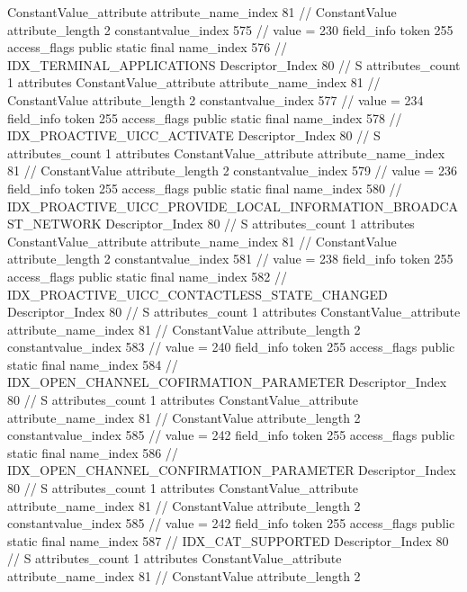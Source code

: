 {{{{{{				ConstantValue_attribute {
					attribute_name_index	81		// ConstantValue
					attribute_length	2
					constantvalue_index	575		// value = 230
				}
				}
			}
			field_info {
				token	255
				access_flags	public static final
				name_index	576		// IDX_TERMINAL_APPLICATIONS
				Descriptor_Index	80		// S
				attributes_count	1
				attributes {
				ConstantValue_attribute {
					attribute_name_index	81		// ConstantValue
					attribute_length	2
					constantvalue_index	577		// value = 234
				}
				}
			}
			field_info {
				token	255
				access_flags	public static final
				name_index	578		// IDX_PROACTIVE_UICC_ACTIVATE
				Descriptor_Index	80		// S
				attributes_count	1
				attributes {
				ConstantValue_attribute {
					attribute_name_index	81		// ConstantValue
					attribute_length	2
					constantvalue_index	579		// value = 236
				}
				}
			}
			field_info {
				token	255
				access_flags	public static final
				name_index	580		// IDX_PROACTIVE_UICC_PROVIDE_LOCAL_INFORMATION_BROADCAST_NETWORK
				Descriptor_Index	80		// S
				attributes_count	1
				attributes {
				ConstantValue_attribute {
					attribute_name_index	81		// ConstantValue
					attribute_length	2
					constantvalue_index	581		// value = 238
				}
				}
			}
			field_info {
				token	255
				access_flags	public static final
				name_index	582		// IDX_PROACTIVE_UICC_CONTACTLESS_STATE_CHANGED
				Descriptor_Index	80		// S
				attributes_count	1
				attributes {
				ConstantValue_attribute {
					attribute_name_index	81		// ConstantValue
					attribute_length	2
					constantvalue_index	583		// value = 240
				}
				}
			}
			field_info {
				token	255
				access_flags	public static final
				name_index	584		// IDX_OPEN_CHANNEL_COFIRMATION_PARAMETER
				Descriptor_Index	80		// S
				attributes_count	1
				attributes {
				ConstantValue_attribute {
					attribute_name_index	81		// ConstantValue
					attribute_length	2
					constantvalue_index	585		// value = 242
				}
				}
			}
			field_info {
				token	255
				access_flags	public static final
				name_index	586		// IDX_OPEN_CHANNEL_CONFIRMATION_PARAMETER
				Descriptor_Index	80		// S
				attributes_count	1
				attributes {
				ConstantValue_attribute {
					attribute_name_index	81		// ConstantValue
					attribute_length	2
					constantvalue_index	585		// value = 242
				}
				}
			}
			field_info {
				token	255
				access_flags	public static final
				name_index	587		// IDX_CAT_SUPPORTED
				Descriptor_Index	80		// S
				attributes_count	1
				attributes {
				ConstantValue_attribute {
					attribute_name_index	81		// ConstantValue
					attribute_length	2
}}}}}}}
